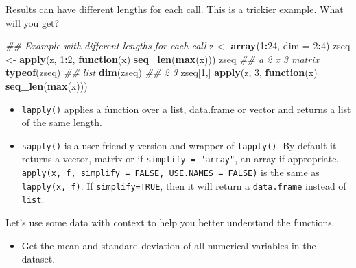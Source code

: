 \documentclass[12pt,]{krantz}
\makeatletter
\newenvironment{Shaded}{\begin{snugshade}}{\end{snugshade}}
\newcommand{\CommentTok}[1]{\textcolor[rgb]{0.37,0.37,0.37}{\textit{#1}}}
\newcommand{\ControlFlowTok}[1]{\textcolor[rgb]{0.27,0.27,0.27}{\textbf{#1}}}
\newcommand{\DataTypeTok}[1]{\textcolor[rgb]{0.27,0.27,0.27}{#1}}
\newcommand{\DecValTok}[1]{\textcolor[rgb]{0.06,0.06,0.06}{#1}}
\newcommand{\KeywordTok}[1]{\textcolor[rgb]{0.27,0.27,0.27}{\textbf{#1}}}
\newcommand{\NormalTok}[1]{#1}
\newcommand{\OperatorTok}[1]{\textcolor[rgb]{0.43,0.43,0.43}{\textbf{#1}}}
\newcommand{\StringTok}[1]{\textcolor[rgb]{0.5,0.5,0.5}{#1}}
\providecommand{\tightlist}{%
  \setlength{\itemsep}{0pt}\setlength{\parskip}{0pt}}
\newenvironment{kframe}{%
\medskip{}
\setlength{\fboxsep}{.8em}
 \def\at@end@of@kframe{}%
 \ifinner\ifhmode%
  \def\at@end@of@kframe{\end{minipage}}%
  \begin{minipage}{\columnwidth}%
 \fi\fi%
 \def\FrameCommand##1{\hskip\@totalleftmargin \hskip-\fboxsep
 \colorbox{shadecolor}{##1}\hskip-\fboxsep
     \hskip-\linewidth \hskip-\@totalleftmargin \hskip\columnwidth}%
 \MakeFramed {\advance\hsize-\width
   \@totalleftmargin\z@ \linewidth\hsize
   \@setminipage}}%
 {\par\unskip\endMakeFramed%
 \at@end@of@kframe}
\renewenvironment{Shaded}{\begin{kframe}}{\end{kframe}}
\makeatother
\begin{document}
Results can have different lengths for each call. This is a trickier example. What will you get?

\begin{Shaded}
\begin{Highlighting}[]
\CommentTok{## Example with different lengths for each call}
\NormalTok{z <-}\StringTok{ }\KeywordTok{array}\NormalTok{(}\DecValTok{1}\OperatorTok{:}\DecValTok{24}\NormalTok{, }\DataTypeTok{dim =} \DecValTok{2}\OperatorTok{:}\DecValTok{4}\NormalTok{)}
\NormalTok{zseq <-}\StringTok{ }\KeywordTok{apply}\NormalTok{(z, }\DecValTok{1}\OperatorTok{:}\DecValTok{2}\NormalTok{, }\ControlFlowTok{function}\NormalTok{(x) }\KeywordTok{seq_len}\NormalTok{(}\KeywordTok{max}\NormalTok{(x)))}
\NormalTok{zseq         }\CommentTok{## a 2 x 3 matrix}
\KeywordTok{typeof}\NormalTok{(zseq) }\CommentTok{## list}
\KeywordTok{dim}\NormalTok{(zseq) }\CommentTok{## 2 3}
\NormalTok{zseq[}\DecValTok{1}\NormalTok{,]}
\KeywordTok{apply}\NormalTok{(z, }\DecValTok{3}\NormalTok{, }\ControlFlowTok{function}\NormalTok{(x) }\KeywordTok{seq_len}\NormalTok{(}\KeywordTok{max}\NormalTok{(x)))}
\end{Highlighting}
\end{Shaded}

\begin{itemize}
\tightlist
\item
  \texttt{lapply()} applies a function over a list, data.frame or vector and returns a list of the same length.
\item
  \texttt{sapply()} is a user-friendly version and wrapper of \texttt{lapply()}. By default it returns a vector, matrix or if \texttt{simplify\ =\ "array"}, an array if appropriate. \texttt{apply(x,\ f,\ simplify\ =\ FALSE,\ USE.NAMES\ =\ FALSE)} is the same as \texttt{lapply(x,\ f)}. If \texttt{simplify=TRUE}, then it will return a \texttt{data.frame} instead of \texttt{list}.
\end{itemize}

Let's use some data with context to help you better understand the functions.

\begin{itemize}
\tightlist
\item
  Get the mean and standard deviation of all numerical variables in the dataset.
\end{itemize}

\begin{Shaded}
\end{Shaded}
\end{document}
